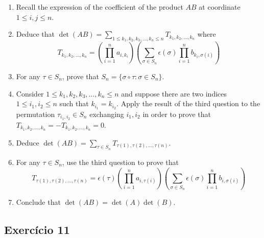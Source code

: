 \begin{enumerate}
\item Recall the expression of the coefficient of the product $AB$ at
  coordinate $1 \leq i,j \leq n$.
\item Deduce that $\det(AB) =
  \sum_{1\leq k_1,k_2,k_3,\dots,k_n\leq n} T_{k_1,k_2,\dots,k_n}$ where
  $$T_{k_1,k_2,\dots,k_n} =
  \left(\prod_{i=1}^n a_{i,k_i}\right)\left(
  \sum_{\sigma \in S_n} \epsilon{(\sigma)}
  {\prod_{i=1}^n b_{k_i,\sigma(i)}}\right)
  $$
\item For any $\tau \in S_n$,
  prove that $S_n = \{ \sigma \circ \tau : \sigma \in S_n \}$.

\item  Consider $1\leq k_1,k_2,k_3,\dots,k_n\leq n$ and suppose there are two
  indices $1 \leq i_1,i_2 \leq n$ such that $k_{i_1} = k_{i_2}$.
  Apply the result of the third question to the
  permutation $\tau_{i_1,i_2} \in S_n$ exchanging $i_1,i_2$ in order
  to prove that $T_{k_1,k_2,\dots,k_n} = -T_{k_1,k_2,\dots,k_n} = 0$.

\item Deduce $\det(AB) = \sum_{\tau \in S_n} T_{\tau(1), \tau(2), \dots, \tau(n)}$.

\item For any $\tau \in S_n$, use the third question to prove that
  $$T_{\tau(1), \tau(2), \dots, \tau(n)} =
  \epsilon{(\tau)}
     \left(\prod_{i=1}^n a_{i,\tau{(i)}}\right)
  \left(\sum_{\sigma \in S_n}
     \epsilon{(\sigma)}
     {\prod_{i=1}^n b_{i,\sigma(i)}}\right)
     $$

\item Conclude that $\det(AB) = \det(A) \det(B)$.

\end{enumerate}

\subsection*{Exercício 11}

